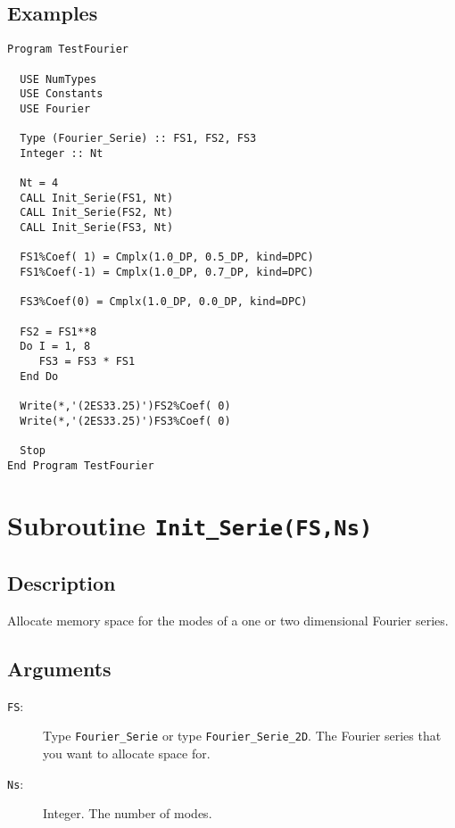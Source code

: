 \subsection{Examples}

\begin{lstlisting}[emph=Type,
                   emphstyle=\color{blue},
                   frame=trBL,
                   caption=''Exponentiating'' Fourier series.,
                   label=expf]
Program TestFourier

  USE NumTypes
  USE Constants
  USE Fourier

  Type (Fourier_Serie) :: FS1, FS2, FS3
  Integer :: Nt

  Nt = 4
  CALL Init_Serie(FS1, Nt)
  CALL Init_Serie(FS2, Nt)
  CALL Init_Serie(FS3, Nt)

  FS1%Coef( 1) = Cmplx(1.0_DP, 0.5_DP, kind=DPC)
  FS1%Coef(-1) = Cmplx(1.0_DP, 0.7_DP, kind=DPC)

  FS3%Coef(0) = Cmplx(1.0_DP, 0.0_DP, kind=DPC)

  FS2 = FS1**8
  Do I = 1, 8
     FS3 = FS3 * FS1
  End Do

  Write(*,'(2ES33.25)')FS2%Coef( 0)
  Write(*,'(2ES33.25)')FS3%Coef( 0)

  Stop
End Program TestFourier
\end{lstlisting}


\section{Subroutine \texttt{Init\_Serie(FS,Ns)}}
\label{sc:InitSerie}

\subsection{Description}

Allocate memory space for the modes of a one or two dimensional
Fourier series.

\subsection{Arguments}

\begin{description}
\item[\texttt{FS}:] Type \texttt{Fourier\_Serie} or type
  \texttt{Fourier\_Serie\_2D}. The Fourier series that you want
  to allocate space for.
\item[\texttt{Ns}:] Integer. The number of modes.
\end{description}

